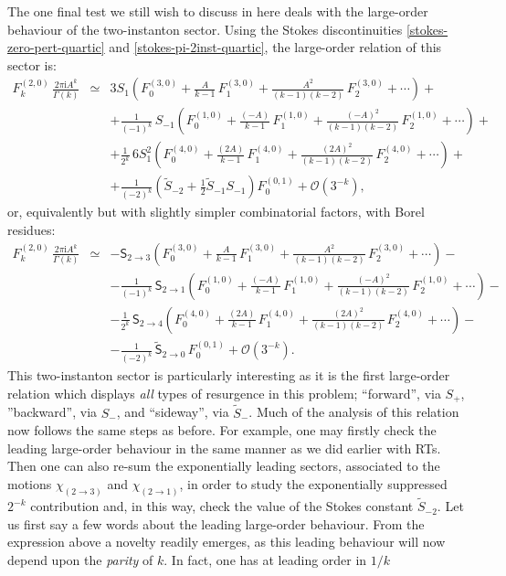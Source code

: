 \documentclass[11pt,a4paper]{article}
\newcommand{\rmi}{{\mathrm{i}}}
\begin{document}
The one final test we still wish to discuss in here deals with the large-order behaviour of the two-instanton sector. Using the Stokes discontinuities \eqref{stokes-zero-pert-quartic} and \eqref{stokes-pi-2inst-quartic}, the large-order relation of this sector is:
%
\begin{eqnarray}
F_{k}^{(2,0)}\, \frac{2\pi\rmi A^k}{\Gamma(k)} &\simeq& 3 S_1 \left( F_0^{(3,0)} + \frac{A}{k-1}\, F_1^{(3,0)} + \frac{A^2}{(k-1)(k-2)}\, F_2^{(3,0)} + \cdots \right) + \nonumber \\
&&
+ \frac{1}{(-1)^k}\, S_{-1} \left( F_0^{(1,0)} + \frac{\left( -A \right)}{k-1}\, F_1^{(1,0)} + \frac{\left( -A \right)^2}{(k-1)(k-2)}\, F_2^{(1,0)} + \cdots \right) + \nonumber \\
&&
+ \frac{1}{2^k}\, 6 S_1^2 \left( F_0^{(4,0)} + \frac{\left( 2A \right)}{k-1}\, F_1^{(4,0)} + \frac{\left( 2A \right)^2}{(k-1)(k-2)}\, F_2^{(4,0)} + \cdots \right) + \nonumber \\
&&
+ \frac{1}{(-2)^k} \left( \widetilde{S}_{-2} + \frac{1}{2} \widetilde{S}_{-1} S_{-1}  \right) F_0^{(0,1)} + \mathcal{O} (3^{-k}),
\label{large-order-2-inst-quartic}
\end{eqnarray}
%
\noindent
or, equivalently but with slightly simpler combinatorial factors, with Borel residues:
%
\begin{eqnarray}
F_{k}^{(2,0)}\, \frac{2\pi\rmi A^k}{\Gamma(k)} &\simeq& - \mathsf{S}_{2\to3} \left( F_0^{(3,0)} + \frac{A}{k-1}\, F_1^{(3,0)} + \frac{A^2}{(k-1)(k-2)}\, F_2^{(3,0)} + \cdots \right) - \nonumber \\
&&
- \frac{1}{(-1)^k}\, \mathsf{S}_{2\to1} \left( F_0^{(1,0)} + \frac{\left( -A \right)}{k-1}\, F_1^{(1,0)} + \frac{\left( -A \right)^2}{(k-1)(k-2)}\, F_2^{(1,0)} + \cdots \right) - \nonumber \\
&&
- \frac{1}{2^k}\, \mathsf{S}_{2\to4} \left( F_0^{(4,0)} + \frac{\left( 2A \right)}{k-1}\, F_1^{(4,0)} + \frac{\left( 2A \right)^2}{(k-1)(k-2)}\, F_2^{(4,0)} + \cdots \right) - \nonumber \\
&&
- \frac{1}{(-2)^k}\, \widetilde{\mathsf{S}}_{2\to0}\, F_0^{(0,1)} + \mathcal{O} (3^{-k}).
\end{eqnarray}
%
\noindent
This two-instanton sector is particularly interesting as it is the first large-order relation which displays \textit{all} types of resurgence in this problem; ``forward'', via $S_+$, ''backward'', via $S_-$, and ``sideway'', via $\widetilde{S}_-$. Much of the analysis of this relation now follows the same steps as before. For example, one may firstly check the leading large-order behaviour in the same manner as we did earlier with RTs. Then one can also re-sum the exponentially leading sectors, associated to the motions $\chi_{(2\rightarrow3)}$ and $\chi_{(2\rightarrow1)}$, in order to study the exponentially suppressed $2^{-k}$ contribution and, in this way, check the value of the Stokes constant $\widetilde{S}_{-2}$. Let us first say a few words about the leading large-order behaviour. From the expression above a novelty readily emerges, as this leading behaviour will now depend upon the \textit{parity} of $k$. In fact, one has at leading order in $1/k$
\end{document}
